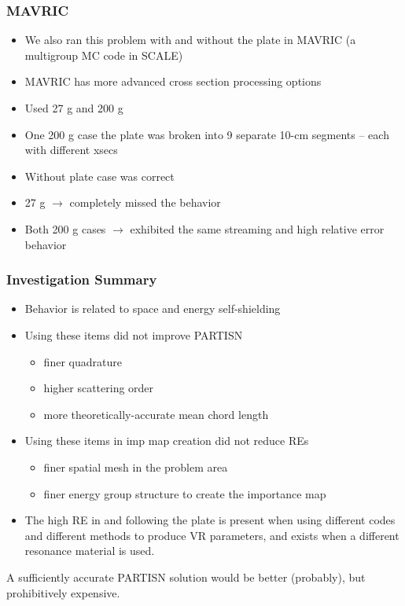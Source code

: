 \documentclass[xcolor=x11names,compress]{beamer}
\renewcommand{\(}{\begin{columns}}
\renewcommand{\)}{\end{columns}}
\newcommand{\<}[1]{\begin{column}{#1}}
\renewcommand{\>}{\end{column}}
\begin{document}
\begin{frame}[fragile]
  \frametitle{MAVRIC}
  
  \begin{itemize}
  \item We also ran this problem with and without the plate in MAVRIC (a multigroup MC code in SCALE)
  \item MAVRIC has more advanced cross section processing options
  \item Used 27 g and 200 g
  \item One 200 g case the plate was broken into 9 separate 10-cm segments – each with different xsecs
  \item Without plate case was correct
  \item 27 g $\rightarrow$ completely missed the behavior
  \item Both 200 g cases $\rightarrow$ exhibited the same streaming and high relative error behavior
  \end{itemize}
  
\end{frame}

\begin{frame}[fragile]
  \frametitle{Investigation Summary}
  
	\begin{itemize}
	\item Behavior is related to space and energy self-shielding
	
	\item Using these items did not improve PARTISN
	 \begin{itemize}
	 \item finer quadrature
	 \item higher scattering order
	 \item more theoretically-accurate mean chord length
	 \end{itemize}
	 
	\item Using these items in imp map creation did not reduce REs
	 \begin{itemize}
	 \item finer spatial mesh in the problem area
	 \item finer energy group structure to create the importance map
	 \end{itemize}
	 
	\item The high RE in and following the plate is present when using different codes and different methods to produce VR parameters, and exists when a different resonance material is used.
	\end{itemize}


A sufficiently accurate PARTISN solution would be better (probably), but prohibitively expensive.
  
\end{frame}
\end{document}
